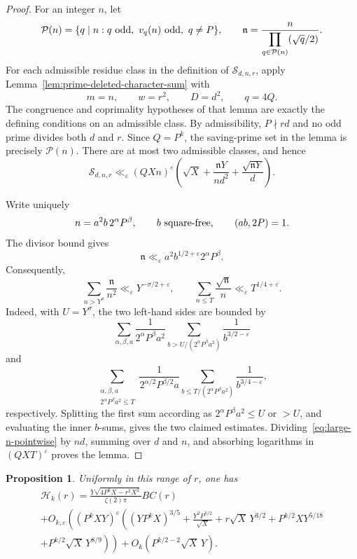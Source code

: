 \documentclass[12pt,reqno]{amsart}
\numberwithin{equation}{section}
\theoremstyle{plain}
\newtheorem{proposition}[theorem]{Proposition}
\theoremstyle{definition}
\theoremstyle{remark}
\begin{document}
\begin{proof}
For an integer $n$, let
\[
\mathcal P(n)
=
\{q\mid n:q\ {\rm odd},\ v_q(n)\ {\rm odd},\ q\neq P\},
\qquad
\mathfrak n
=
\frac{n}{\displaystyle\prod_{q\in\mathcal P(n)}(\sqrt q/2)}.
\]
For each admissible residue class in the definition of
$\mathcal S_{d,n,r}$, apply Lemma~\ref{lem:prime-deleted-character-sum} with
\[
m=n,
\qquad
w=r^2,
\qquad
D=d^2,
\qquad
q=4Q.
\]
The congruence and coprimality hypotheses of that lemma are exactly the defining conditions on an admissible class.
By admissibility, $P\nmid rd$ and no odd prime divides both $d$ and $r$.
Since $Q=P^k$, the saving-prime set in the lemma is precisely $\mathcal P(n)$.
There are at most two admissible classes, and hence
\begin{equation}\label{eq:large-n-pointwise}
\mathcal S_{d,n,r}
\ll_\varepsilon
(QXn)^\varepsilon
\left(
\sqrt X+\frac{\mathfrak nY}{nd^2}
+\frac{\sqrt{\mathfrak nY}}d
\right).
\end{equation}

Write uniquely
\[
n=a^2b\,2^\alpha P^\beta,
\qquad
b\ {\rm square\mbox{-}free},
\qquad
(ab,2P)=1.
\]
The divisor bound gives
\[
\mathfrak n
\ll_\varepsilon
a^2b^{1/2+\varepsilon}2^\alpha P^\beta.
\]
Consequently,
\[
\sum_{n>Y^\sigma}\frac{\mathfrak n}{n^2}
\ll_\varepsilon Y^{-\sigma/2+\varepsilon},
\qquad
\sum_{n\leq T}\frac{\sqrt{\mathfrak n}}n
\ll_\varepsilon T^{1/4+\varepsilon}.
\]
Indeed, with $U=Y^\sigma$, the two left-hand sides are bounded by
\[
\sum_{\alpha,\beta,a}
\frac1{2^\alpha P^\beta a^2}
\sum_{b>U/(2^\alpha P^\beta a^2)}
\frac1{b^{3/2-\varepsilon}}
\]
and
\[
\sum_{\substack{\alpha,\beta,a\\
2^\alpha P^\beta a^2\leq T}}
\frac1{2^{\alpha/2}P^{\beta/2}a}
\sum_{b\leq T/(2^\alpha P^\beta a^2)}
\frac1{b^{3/4-\varepsilon}},
\]
respectively.
Splitting the first sum according as
$2^\alpha P^\beta a^2\leq U$ or $>U$, and evaluating the inner $b$-sums, gives the two claimed estimates.
Dividing~\eqref{eq:large-n-pointwise} by $nd$, summing over $d$ and $n$, and absorbing logarithms in $(QXT)^\varepsilon$ proves the
lemma.
\end{proof}

\begin{proposition}\label{prop:hyperbolic-one-r}
Uniformly in this range of $r$, one has
\begin{multline*}
\mathcal H_k(r)
=
\frac{Y\sqrt{4P^kX-r^2X^2}}{\zeta(2)\pi}BC(r)
\\
+
O_{k,\varepsilon}\left(
(P^kXY)^\varepsilon
\left(
(YP^kX)^{3/5}
+
\frac{Y^2P^{k/2}}{\sqrt X}
+
r\sqrt X\,Y^{3/2}
+
P^{k/2}XY^{5/18}
\right.\right.
\\ \left.\left.
+
P^{k/2}\sqrt X\,Y^{8/9}
\right)
\right)
+
O_k\left(P^{k/2-2}\sqrt X\,Y\right).
\end{multline*}
\end{proposition}
\end{document}

